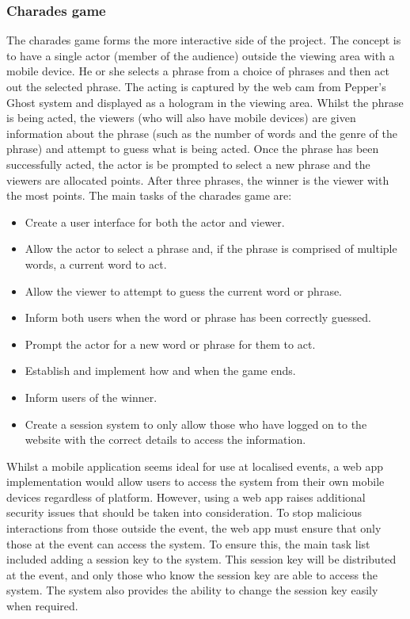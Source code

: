 \subsubsection{Charades game}
The charades game forms the more interactive side of the project. The concept is to have a single actor (member of the audience) outside the viewing area with a mobile device. He or she selects a phrase from a choice of phrases and then act out the selected phrase. The acting is captured by the web cam from Pepper's Ghost system and displayed as a hologram in the viewing area. Whilst the phrase is being acted, the viewers (who will also have mobile devices) are given information about the phrase (such as the number of words and the genre of the phrase) and attempt to guess what is being acted. Once the phrase has been successfully acted, the actor is be prompted to select a new phrase and the viewers are allocated points. After three phrases, the winner is the viewer with the most points. The main tasks of the charades game are:

\begin{itemize}
	\item Create a user interface for both the actor and viewer.

	\item Allow the actor to select a phrase and, if the phrase is comprised of multiple words, a current word to act.

	\item Allow the viewer to attempt to guess the current word or phrase.

	\item Inform both users when the word or phrase has been correctly guessed.

	\item Prompt the actor for a new word or phrase for them to act.

	\item Establish and implement how and when the game ends.

	\item Inform users of the winner.

	\item Create a session system to only allow those who have logged on to the website with the correct details to access the information.

\end{itemize}

Whilst a mobile application seems ideal for use at localised events, a web app implementation would allow users to access the system from their own mobile devices regardless of platform. However, using a web app raises additional security issues that should be taken into consideration. To stop malicious interactions from those outside the event, the web app must ensure that only those at the event can access the system. To ensure this, the main task list included adding a session key to the system. This session key will be distributed at the event, and only those who know the session key are able to access the system. The system also provides the ability to change the session key easily when required.

